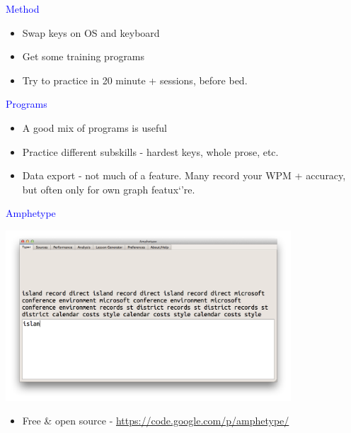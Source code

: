 \documentclass[landscape]{slides}
\begin{document}
\begin{slide}

    \textcolor{blue}{\Large{Method}}

    \begin{itemize}
        \item Swap keys on OS and keyboard
        \item Get some training programs
        \item Try to practice in 20 minute + sessions, before bed.
    \end{itemize}

\end{slide}


\begin{slide}

    \textcolor{blue}{\Large{Programs}}

    \begin{itemize}
        \item A good mix of programs is useful
        \item Practice different subskills - hardest keys, whole prose, etc.
        \item Data export - not much of a feature. Many record your WPM + accuracy, but often only for own graph featux`'re.
    \end{itemize}

\end{slide}


\begin{slide}

    \textcolor{blue}{\Large{Amphetype}}

    \centering

    \includegraphics[width=0.8\textwidth]{amphetype-screenshot}

    \begin{itemize}
        \item Free \& open source - \url{https://code.google.com/p/amphetype/}
    \end{itemize}

\end{slide}
\end{document}
